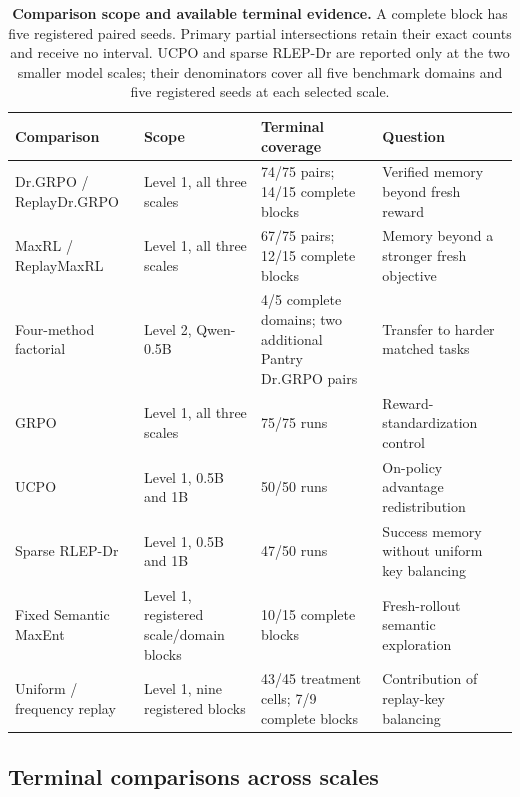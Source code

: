 \begin{table}[H]
  \centering
  \caption{\textbf{Comparison scope and available terminal evidence.}
  A complete block has five registered paired seeds. Primary partial
  intersections retain their exact counts and receive no interval.
  UCPO and sparse RLEP-Dr are reported only at the two smaller model scales;
  their denominators cover all five benchmark domains and five registered
  seeds at each selected scale.}
  \label{tab:experiment-map}
  \label{tab:direct-comparators}
  \scriptsize
  \setlength{\tabcolsep}{3pt}
  \begin{tabularx}{\linewidth}{@{}P{.24\linewidth}P{.20\linewidth}P{.22\linewidth}Y@{}}
    \toprule
    \textbf{Comparison} & \textbf{Scope} & \textbf{Terminal coverage}
      & \textbf{Question} \\
    \midrule
    Dr.GRPO / ReplayDr.GRPO & Level 1, all three scales &
      74/75 pairs; 14/15 complete blocks & Verified memory beyond fresh reward \\
    MaxRL / ReplayMaxRL & Level 1, all three scales &
      67/75 pairs; 12/15 complete blocks & Memory beyond a stronger fresh objective \\
    Four-method factorial & Level 2, Qwen-0.5B &
      4/5 complete domains; two additional Pantry Dr.GRPO pairs & Transfer to harder matched tasks \\
    GRPO & Level 1, all three scales &
      75/75 runs & Reward-standardization control \\
    UCPO & Level 1, 0.5B and 1B &
      50/50 runs & On-policy advantage redistribution \\
    Sparse RLEP-Dr & Level 1, 0.5B and 1B &
      47/50 runs & Success memory without uniform key balancing \\
    Fixed Semantic MaxEnt & Level 1, registered scale/domain blocks &
      10/15 complete blocks & Fresh-rollout semantic exploration \\
    Uniform / frequency replay & Level 1, nine registered blocks &
      43/45 treatment cells; 7/9 complete blocks & Contribution of replay-key balancing \\
    \bottomrule
  \end{tabularx}
\end{table}

\subsection{Terminal comparisons across scales}
\label{app:scale-matrix}
\label{app:scale-snapshot}
\label{app:maxrl-scale-extensions}
\label{app:current-campaign-results}

